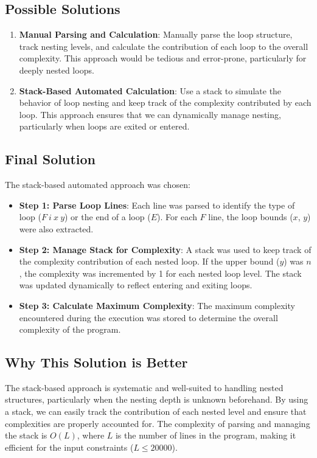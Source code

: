 \documentclass{article}
\begin{document}
\subsection{Possible Solutions}
\begin{enumerate}
    \item \textbf{Manual Parsing and Calculation}: Manually parse the loop structure, track nesting levels, and calculate the contribution of each loop to the overall complexity. This approach would be tedious and error-prone, particularly for deeply nested loops.
    
    \item \textbf{Stack-Based Automated Calculation}: Use a stack to simulate the behavior of loop nesting and keep track of the complexity contributed by each loop. This approach ensures that we can dynamically manage nesting, particularly when loops are exited or entered.
\end{enumerate}

\subsection{Final Solution}
The stack-based automated approach was chosen:
\begin{itemize}
    \item \textbf{Step 1: Parse Loop Lines}: Each line was parsed to identify the type of loop ($F\ i\ x\ y$) or the end of a loop ($E$). For each $F$ line, the loop bounds ($x$, $y$) were also extracted.
    \item \textbf{Step 2: Manage Stack for Complexity}: A stack was used to keep track of the complexity contribution of each nested loop. If the upper bound ($y$) was $n$, the complexity was incremented by 1 for each nested loop level. The stack was updated dynamically to reflect entering and exiting loops.
    \item \textbf{Step 3: Calculate Maximum Complexity}: The maximum complexity encountered during the execution was stored to determine the overall complexity of the program.
\end{itemize}

\subsection{Why This Solution is Better}
The stack-based approach is systematic and well-suited to handling nested structures, particularly when the nesting depth is unknown beforehand. By using a stack, we can easily track the contribution of each nested level and ensure that complexities are properly accounted for. The complexity of parsing and managing the stack is $O(L)$, where $L$ is the number of lines in the program, making it efficient for the input constraints ($L \leq 20000$).
\end{document}
